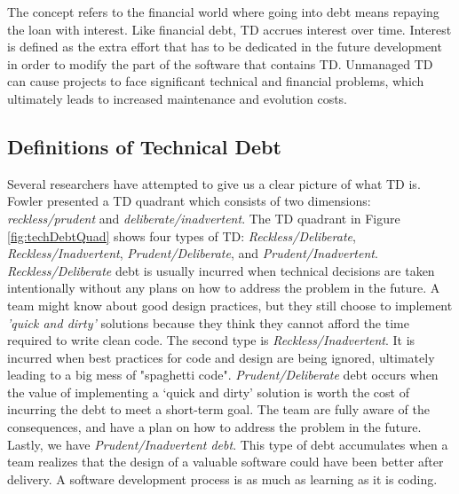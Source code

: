 The concept refers to the financial world where going into debt means repaying the loan with interest\cite{p50-allman}. Like financial debt, TD accrues interest over time. Interest is defined as the extra effort that has to be dedicated in the future development in order to modify the part of the software that contains TD\cite{p31-guo,p35-klinger,li2015systematic}. Unmanaged TD can cause projects to face significant technical and financial problems, which ultimately leads to increased maintenance and evolution costs\cite{nord2012search}. 



\subsection{Definitions of Technical Debt}
Several researchers have attempted to give us a clear picture of what TD is\cite{url-fowler,url-mcconnell,krutchen}. Fowler\cite{url-fowler} presented a TD quadrant which consists of two dimensions: \textit{reckless/prudent} and \textit{deliberate/inadvertent}\cite{url-fowler}. The TD quadrant in Figure \ref{fig:techDebtQuad} shows four types of TD: \textit{Reckless/Deliberate}, \textit{Reckless/Inadvertent}, \textit{Prudent/Deliberate}, and \textit{Prudent/Inadvertent}. \textit{Reckless/Deliberate} debt is usually incurred when technical decisions are taken intentionally without any plans on how to address the problem in the future. A team might know about good design practices, but they still choose to implement \textit{'quick and dirty'} solutions because they think they cannot afford the time required to write clean code. The second type is \textit{Reckless/Inadvertent}. It is incurred when best practices for code and design are being ignored, ultimately leading to a big mess of "spaghetti code". \textit{Prudent/Deliberate} debt occurs when the value of implementing a ‘quick and dirty’ solution is worth the cost of incurring the debt to meet a short-term goal. The team are fully aware of the consequences, and have a plan on how to address the problem in the future. Lastly, we have \textit{Prudent/Inadvertent debt}. This type of debt accumulates when a team realizes that the design of a valuable software could have been better after delivery. A software development process is as much as learning as it is coding.

